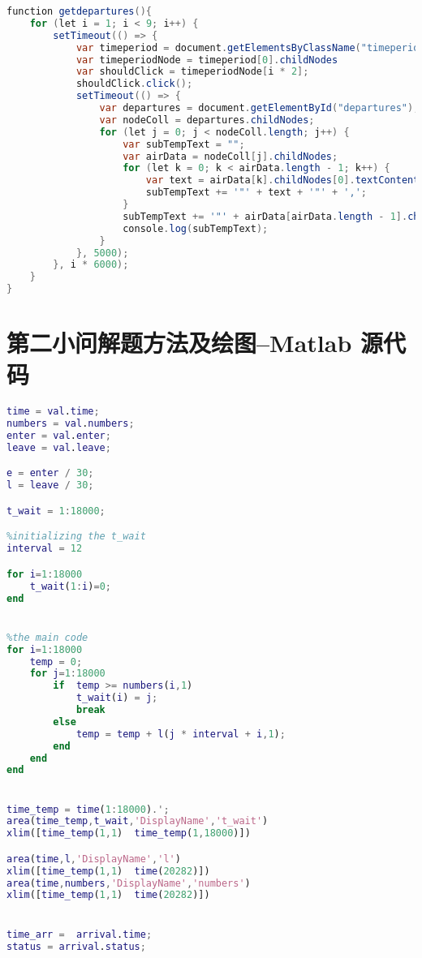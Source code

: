 \documentclass[withoutpreface,bwprint]{cumcmthesis} %
\begin{document}
\begin{appendices}
\begin{lstlisting}[language=java]
function getdepartures(){
    for (let i = 1; i < 9; i++) {
        setTimeout(() => {
            var timeperiod = document.getElementsByClassName("timeperiod");
            var timeperiodNode = timeperiod[0].childNodes
            var shouldClick = timeperiodNode[i * 2];
            shouldClick.click();
            setTimeout(() => {
                var departures = document.getElementById("departures");
                var nodeColl = departures.childNodes;
                for (let j = 0; j < nodeColl.length; j++) {
                    var subTempText = "";
                    var airData = nodeColl[j].childNodes;
                    for (let k = 0; k < airData.length - 1; k++) {
                        var text = airData[k].childNodes[0].textContent;
                        subTempText += '"' + text + '"' + ',';
                    }
                    subTempText += '"' + airData[airData.length - 1].childNodes[0].textContent + '"';
                    console.log(subTempText);
                }
            }, 5000);
        }, i * 6000);
    }    
}

\end{lstlisting}

	\section{第二小问解题方法及绘图--Matlab 源代码}
	\begin{lstlisting}[language=Matlab]
time = val.time;
numbers = val.numbers;
enter = val.enter;
leave = val.leave;

e = enter / 30;
l = leave / 30;

t_wait = 1:18000;

%initializing the t_wait
interval = 12

for i=1:18000
    t_wait(1:i)=0;
end


%the main code
for i=1:18000
    temp = 0;
    for j=1:18000
        if  temp >= numbers(i,1)
            t_wait(i) = j;
            break
        else 
            temp = temp + l(j * interval + i,1);
        end
    end
end


time_temp = time(1:18000).';
area(time_temp,t_wait,'DisplayName','t_wait')
xlim([time_temp(1,1)  time_temp(1,18000)])

area(time,l,'DisplayName','l')
xlim([time_temp(1,1)  time(20282)])
area(time,numbers,'DisplayName','numbers')
xlim([time_temp(1,1)  time(20282)])


time_arr =  arrival.time;
status = arrival.status;


\end{lstlisting}
\end{appendices}
\end{document}
